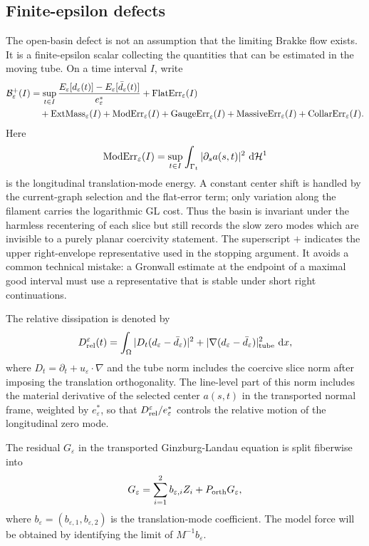 \documentclass[11pt]{article}
\theoremstyle{definition}
\newcommand{\dd}{\,\mathrm d}
\newcommand{\eps}{\varepsilon}
\newcommand{\estar}{e_\varepsilon^\ast}
\newcommand{\Basin}{\mathcal B}
\newcommand{\Hh}{\mathcal H}
\begin{document}
\subsection{Finite-epsilon defects}

The open-basin defect is not an assumption that the limiting Brakke flow
exists.  It is a finite-epsilon scalar collecting the quantities that can be
estimated in the moving tube.  On a time interval \(I\), write
\[
\begin{aligned}
        \Basin_\eps^+(I)
        &=
        \sup_{t\in I}
        \frac{
        E_\eps[d_\eps(t)]-E_\eps[\bar d_\eps(t)]
        }{\estar}
        +
        {\rm FlatErr}_\eps(I)
\\
        &\quad+
        {\rm ExtMass}_\eps(I)
        +
        {\rm ModErr}_\eps(I)
        +
        {\rm GaugeErr}_\eps(I)
        +
        {\rm MassiveErr}_\eps(I)
        +
        {\rm CollarErr}_\eps(I).
\end{aligned}
\]
Here
\[
        {\rm ModErr}_\eps(I)
        =
        \sup_{t\in I}
        \int_{\Gamma_t}|\partial_s a(s,t)|^2\,\dd\Hh^1
\]
is the longitudinal translation-mode energy.  A constant center shift is handled
by the current-graph selection and the flat-error term; only variation along
the filament carries the logarithmic GL cost.  Thus the basin is invariant under
the harmless recentering of each slice but still records the slow zero modes
which are invisible to a purely planar coercivity statement.
The superscript \(+\) indicates the upper right-envelope representative used in
the stopping argument.  It avoids a common technical mistake: a Gronwall
estimate at the endpoint of a maximal good interval must use a representative
that is stable under short right continuations.

The relative dissipation is denoted by
\[
        D_{\rm rel}^\eps(t)
        =
        \int_\Omega
        |D_t(d_\eps-\bar d_\eps)|^2
        +
        |\nabla(d_\eps-\bar d_\eps)|^2_{\rm tube}
        \,\dd x ,
\]
where \(D_t=\partial_t+u_\eps\cdot\nabla\) and the tube norm includes the
coercive slice norm after imposing the translation orthogonality.  The
line-level part of this norm includes the material derivative of the selected
center \(a(s,t)\) in the transported normal frame, weighted by \(\estar\), so
that \(D_{\rm rel}^\eps/\estar\) controls the relative motion of the
longitudinal zero mode.

The residual \(G_\eps\) in the transported Ginzburg-Landau equation is split
fiberwise into
\[
        G_\eps
        =
        \sum_{i=1}^2 b_{\eps,i}Z_i
        +
        P_{\rm orth}G_\eps ,
\]
where \(b_\eps=(b_{\eps,1},b_{\eps,2})\) is the translation-mode coefficient.
The model force will be obtained by identifying the limit of \(M^{-1}b_\eps\).
\end{document}
